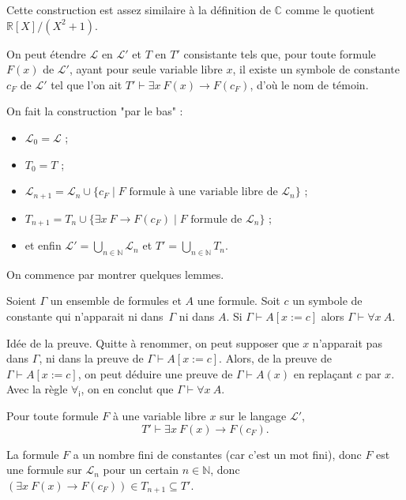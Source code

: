 \documentclass[./main]{subfiles}
\begin{document}
  Cette construction est assez similaire à la définition de $\mathds{C}$ comme le quotient $\mathds{R}[X] / (X^2 + 1)$.

  \begin{prop}
    On peut étendre $\mathcal{L}$ en $\mathcal{L}'$ et $T$ en $T'$ consistante tels que, pour toute formule $F(x)$ de $\mathcal{L}'$, ayant pour seule variable libre $x$, il existe un symbole de constante $c_F$ de $\mathcal{L}'$ tel que l'on ait $T' \vdash \exists x\: F(x) \to F(c_F)$, d'où le nom de témoin.
  \end{prop}

  \begin{prv}
    On fait la construction "par le bas" :
    \begin{itemize}
      \item $\mathcal{L}_0 = \mathcal{L}$ ;
      \item $T_0 = T$ ;
      \item $\mathcal{L}_{n+1} = \mathcal{L}_n \cup \{c_F  \mid F \text{ formule à une variable libre de } \mathcal{L}_n\} $ ;
      \item $T_{n+1} = T_n \cup \{\exists x \: F \to F(c_F)  \mid F \text{ formule de } \mathcal{L}_n\}$ ;
      \item et enfin $\mathcal{L}' = \bigcup_{n \in \mathds{N}} \mathcal{L}_n$ et $T' = \bigcup_{n \in \mathds{N}} T_n$.
    \end{itemize}

    On commence par montrer quelques lemmes.

    \begin{lem}
      \label{lem:fol-var-libre-un-symb}
      Soient $\Gamma$ un ensemble de formules et $A$ une formule.
      Soit $c$ un symbole de constante qui n'apparait ni dans~$\Gamma$ ni dans $A$.
      Si $\Gamma \vdash  A[x := c]$ alors $\Gamma \vdash \forall x\: A$.
    \end{lem}
    \begin{prv}
      Idée de la preuve. Quitte à renommer, on peut supposer que $x$ n'apparait pas dans $\Gamma$, ni dans la preuve de $\Gamma \vdash A[x := c]$.
      Alors, de la preuve de $\Gamma \vdash A[x := c]$, on peut déduire une preuve de $\Gamma \vdash A(x)$ en replaçant $c$ par $x$. Avec la règle $\forall_\mathsf{i}$, on en conclut que $\Gamma \vdash \forall x \: A$.
    \end{prv}

    \begin{lem}
      Pour toute formule $F$ à une variable libre $x$ sur le langage $\mathcal{L}'$,
      \[
        T' \vdash \exists x \: F(x) \to F(c_F)
      .\]
    \end{lem}
    \begin{prv}
      La formule $F$ a un nombre fini de constantes (car c'est un mot fini), donc $F$ est une formule sur $\mathcal{L}_n$ pour un certain $n \in \mathds{N}$, donc $(\exists x \: F(x) \to F(c_F)) \in T_{n+1} \subseteq T'$.
    \end{prv}


\end{prv}
\end{document}

